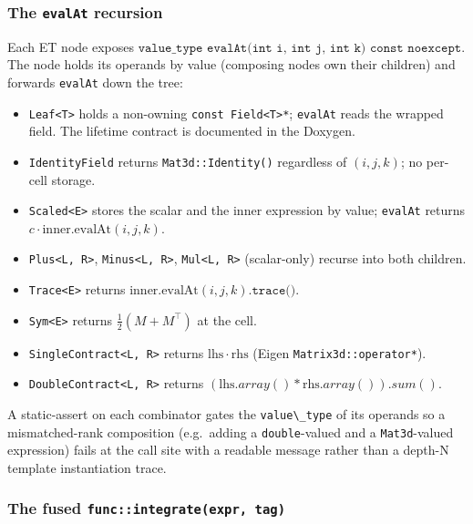 \subsubsection{The \texttt{evalAt} recursion}\label{phase15-evalat}

Each ET node exposes
\(\texttt{value\_type evalAt(int i, int j, int k) const noexcept}\). The
node holds its operands by value (composing nodes own their children)
and forwards \texttt{evalAt} down the tree:

\begin{itemize}
\tightlist
\item
  \passthrough{\lstinline!Leaf<T>!} holds a non-owning
  \passthrough{\lstinline!const Field<T>*!}; \passthrough{\lstinline!evalAt!}
  reads the wrapped field. The lifetime contract is documented in the
  Doxygen.
\item
  \passthrough{\lstinline!IdentityField!} returns
  \passthrough{\lstinline!Mat3d::Identity()!} regardless of \((i, j, k)\);
  no per-cell storage.
\item
  \passthrough{\lstinline!Scaled<E>!} stores the scalar and the inner
  expression by value; \passthrough{\lstinline!evalAt!} returns
  \(c \cdot \mathrm{inner.evalAt}(i, j, k)\).
\item
  \passthrough{\lstinline!Plus<L, R>!}, \passthrough{\lstinline!Minus<L, R>!},
  \passthrough{\lstinline!Mul<L, R>!} (scalar-only) recurse into both children.
\item
  \passthrough{\lstinline!Trace<E>!} returns
  \(\mathrm{inner.evalAt}(i,j,k).\texttt{trace()}\).
\item
  \passthrough{\lstinline!Sym<E>!} returns
  \(\tfrac12(M + M^\top)\) at the cell.
\item
  \passthrough{\lstinline!SingleContract<L, R>!} returns
  \(\mathrm{lhs} \cdot \mathrm{rhs}\) (Eigen
  \passthrough{\lstinline!Matrix3d::operator*!}).
\item
  \passthrough{\lstinline!DoubleContract<L, R>!} returns
  \((\mathrm{lhs}.array() * \mathrm{rhs}.array()).sum()\).
\end{itemize}

A static-assert on each combinator gates the
\passthrough{\lstinline!value\_type!} of its operands so a
mismatched-rank composition (e.g.\ adding a
\passthrough{\lstinline!double!}-valued and a
\passthrough{\lstinline!Mat3d!}-valued expression) fails at the call
site with a readable message rather than a depth-N template
instantiation trace.

\subsubsection{The fused \texttt{func::integrate(expr, tag)}}\label{phase15-fused}

